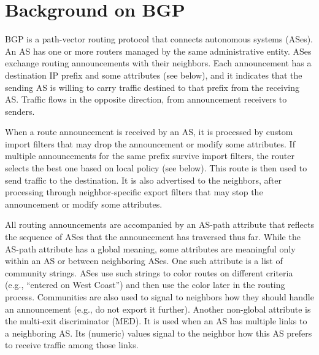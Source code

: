 \documentclass[10pt]{sigalternate052015}
\newcommand{\todo}[1]{\textcolor{red}{[TODO: #1]}}
\newcommand{\sysname}{{\small \sf Propane}\xspace}
\begin{document}





%
%
%
%

\section{Background on BGP}
\label{sec:background}


BGP is a path-vector routing protocol that connects autonomous systems (ASes). An AS has one or more routers managed by the same administrative entity. ASes exchange routing announcements with their neighbors. Each announcement has a destination IP prefix and some attributes (see below), and it indicates that the sending AS is willing to carry traffic destined to that prefix from the receiving AS. Traffic flows in the opposite direction, from announcement receivers to senders.

When a route announcement is received by an AS, it is processed by custom import filters that may drop the announcement or modify some attributes. If multiple announcements for the same prefix survive import filters, the router selects the best one based on local policy (see below). This route is then used to send traffic to the destination. It is also advertised to the neighbors, after processing through neighbor-specific export filters that may stop the announcement or modify some attributes.

All routing announcements are accompanied by an AS-path attribute that reflects the sequence of ASes that the announcement has traversed thus far. While the AS-path attribute has a global meaning, some attributes are meaningful only within an AS or between neighboring ASes.  One such attribute is a list of community strings. ASes use such strings to color routes on different criteria (e.g., ``entered on West Coast'') and then use the color later in the routing process.  Communities are also used to signal to neighbors how they should handle an announcement (e.g., do not export it further). Another non-global attribute is the multi-exit discriminator (MED). It is used when an AS has multiple links to a neighboring AS.  Its (numeric) values signal to the neighbor how this AS prefers to receive traffic among those links.
\end{document}

